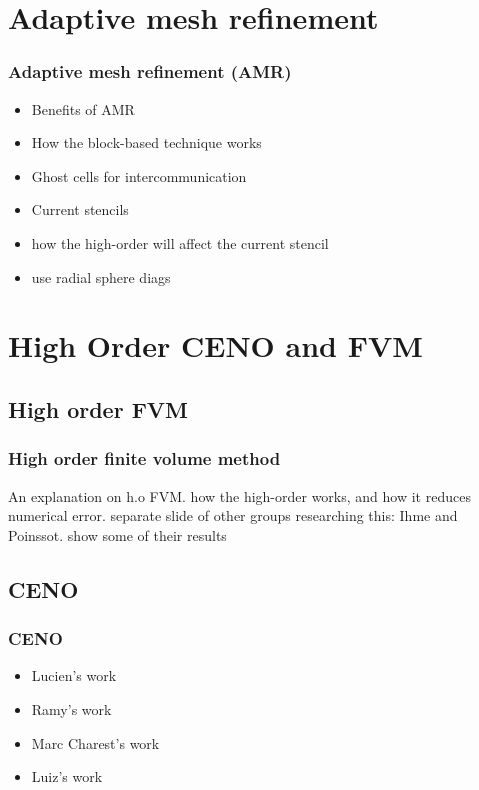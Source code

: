 \documentclass{beamer}
\begin{document}
\section[AMR]{Adaptive mesh refinement}
\begin{frame}%
\frametitle{Adaptive mesh refinement (AMR)}
\scriptsize
\begin{itemize}
\item Benefits of AMR
\item How the block-based technique works
\item Ghost cells for intercommunication
\item Current stencils
\item how the high-order will affect the current stencil
\item use radial sphere diags
\end{itemize}
\end{frame}






\section[FVM]{High Order CENO and FVM}
\subsection{High order FVM}
\begin{frame}%
\frametitle{High order finite volume method}
\scriptsize
An explanation on h.o FVM.
how the high-order works, and how it reduces numerical error.
separate slide of other groups researching this: Ihme and Poinssot. show some of their results
\end{frame}


\subsection{CENO}
\begin{frame}
\scriptsize
\frametitle{CENO}
\begin{itemize}
\item Lucien's work
\item Ramy's work
\item Marc Charest's work
\item Luiz's work
\end{itemize}
\end{frame}
\end{document}
